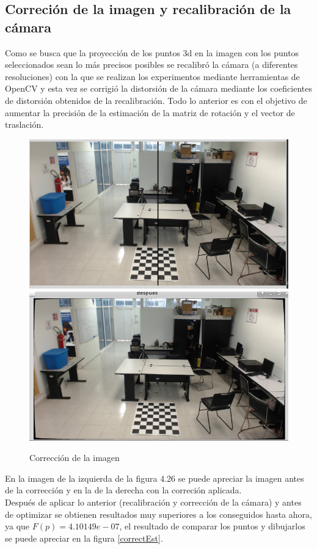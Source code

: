 	\subsection{Correción de la imagen y recalibración de la cámara}
	Como se busca que la proyección de los puntos 3d en la imagen con los puntos seleccionados sean lo más precisos posibles se recalibró la cámara (a diferentes resoluciones) con la que se realizan los experimentos mediante herramientas de OpenCV y esta vez se corrigió la distorsión de la cámara mediante los coeficientes de distorsión obtenidos de la recalibración. Todo lo anterior es con el objetivo de aumentar la precisión de la estimación de la matriz de rotación y el vector de traslación.\\
	\begin{figure}[htbp]
		\centering
		\includegraphics[width=.47\textwidth]{./pictures/p1}
		\includegraphics[width=.47\textwidth]{./pictures/p2}
		\caption{Corrección de la imagen}\label{fig: figura}
	\end{figure}
	En la imagen de la izquierda de la figura 4.26 se puede apreciar la imagen antes de la corrección y en la de la derecha con la correción aplicada.\\
	Después de aplicar lo anterior (recalibración y corrección de la cámara) y antes de optimizar se obtienen resultados muy superiores a los conseguidos hasta ahora, ya que $F(p)=  4.10149e-07$, el resultado de comparar los puntos y dibujarlos se puede apreciar en la figura \ref{correctEst}.\\
